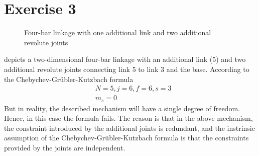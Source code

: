 \section{Exercise 3}
\begin{figure}[h!]
	\centering
	
	\caption{Four-bar linkage with one additional link and two additional revolute joints}
	\label{fig:exception}
\end{figure}
 depicts a two-dimensional four-bar linkage with an additional link (5) and two additional revolute joints connecting link 5 to link 3 and the base. According to the Chebychev-Grübler-Kutzbach formula
\begin{align*}
	&N = 5, j = 6, f = 6, s = 3\\
	&m_s = 0
\end{align*}
But in reality, the described mechanism will have a single degree of freedom. Hence, in this case the formula fails. The reason is that in the above mechanism, the constraint introduced by the additional joints is redundant, and the instrinsic assumption of the Chebychev-Grübler-Kutzbach formula is that the constraints provided by the joints are independent.